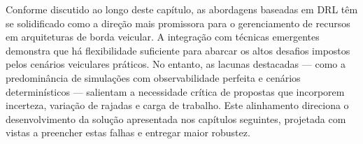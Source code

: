 Conforme discutido ao longo deste capítulo, as abordagens baseadas em \gls{DRL} têm se solidificado como a direção mais promissora para o gerenciamento de recursos em arquiteturas de borda veicular. A integração com técnicas emergentes demonstra que há flexibilidade suficiente para abarcar os altos desafios impostos pelos cenários veiculares práticos. No entanto, as lacunas destacadas --- como a predominância de simulações com observabilidade perfeita e cenários determinísticos --- salientam a necessidade crítica de propostas que incorporem incerteza, variação de rajadas e carga de trabalho. Este alinhamento direciona o desenvolvimento da solução apresentada nos capítulos seguintes, projetada com vistas a preencher estas falhas e entregar maior robustez.





